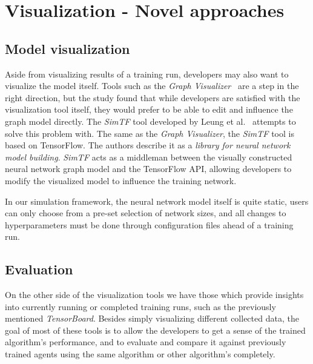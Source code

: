 \section*{Visualization - Novel approaches}

\subsection*{Model visualization}

Aside from visualizing results of a training run, developers may also want to visualize the model itself. Tools such as the \emph{Graph Visualizer}~\cite{GraphVisualizer} are a step in the right direction, but the study found that while developers are satisfied with the visualization tool itself, they would prefer to be able to edit and influence the graph model directly. The \emph{SimTF} tool developed by Leung et al.~\cite{NeuralNetworkVisualization} attempts to solve this problem with. The same as the \emph{Graph Visualizer}, the \emph{SimTF} tool is based on TensorFlow. The authors describe it as a \emph{library for neural network model building}. \emph{SimTF} acts as a middleman between the visually constructed neural network graph model and the TensorFlow API, allowing developers to modify the visualized model to influence the training network.

In our simulation framework, the neural network model itself is quite static, users can only choose from a pre-set selection of network sizes, and all changes to hyperparameters must be done through configuration files ahead of a training run.

\subsection*{Evaluation}

On the other side of the visualization tools we have those which provide insights into currently running or completed training runs, such as the previously mentioned \emph{TensorBoard}. Besides simply visualizing different collected data, the goal of most of these tools is to allow the developers to get a sense of the trained algorithm's performance, and to evaluate and compare it against previously trained agents using the same algorithm or other algorithm's completely.

